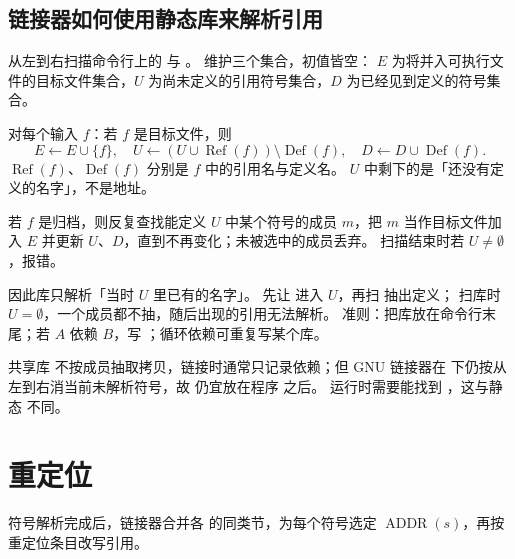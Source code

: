 \subsection{链接器如何使用静态库来解析引用}



从左到右扫描命令行上的  与 。
维护三个集合，初值皆空：
$E$ 为将并入可执行文件的目标文件集合，$U$ 为尚未定义的引用符号集合，$D$ 为已经见到定义的符号集合。

对每个输入 $f$：若 $f$ 是目标文件，则
\[
E\leftarrow E\cup\{f\},
\quad
U\leftarrow (U\cup\operatorname{Ref}(f))\setminus\operatorname{Def}(f),
\quad
D\leftarrow D\cup\operatorname{Def}(f).
\]
$\operatorname{Ref}(f)$、$\operatorname{Def}(f)$ 分别是 $f$ 中的引用名与定义名。
$U$ 中剩下的是「还没有定义的名字」，不是地址。

若 $f$ 是归档，则反复查找能定义 $U$ 中某个符号的成员 $m$，把 $m$ 当作目标文件加入 $E$ 并更新 $U$、$D$，直到不再变化；未被选中的成员丢弃。
扫描结束时若 $U\neq\emptyset$，报错。

因此库只解析「当时 $U$ 里已有的名字」。
 先让  进入 $U$，再扫  抽出定义；
 扫库时 $U=\emptyset$，一个成员都不抽，随后出现的引用无法解析。
准则：把库放在命令行末尾；若 $A$ 依赖 $B$，写 ；循环依赖可重复写某个库。

共享库  不按成员抽取拷贝，链接时通常只记录依赖；但 GNU 链接器在  下仍按从左到右消当前未解析符号，故  仍宜放在程序  之后。
运行时需要能找到 ，这与静态  不同。

\section{重定位}



符号解析完成后，链接器合并各  的同类节，为每个符号选定 $\operatorname{ADDR}(s)$，再按重定位条目改写引用。


